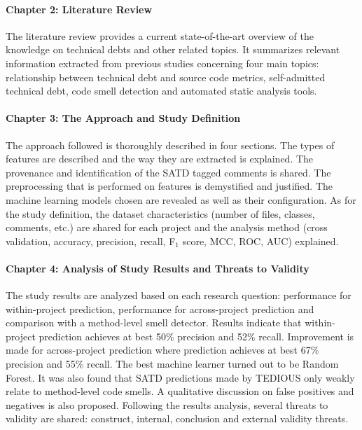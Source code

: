 \paragraph{Chapter 2: Literature Review}
The literature review provides a current state-of-the-art overview of the knowledge on technical debts and other related topics. It summarizes relevant information extracted from previous studies concerning four main topics: relationship between technical debt and source code metrics, self-admitted technical debt, code smell detection and automated static analysis tools.

\paragraph{Chapter 3: The Approach and Study Definition}
The approach followed is thoroughly described in four sections. The types of features are described and the way they are extracted is explained. The provenance and identification of the \ac{SATD} tagged comments is shared. The preprocessing that is performed on features is demystified and justified. The machine learning models chosen are revealed as well as their configuration. As for the study definition, the dataset characteristics (number of files, classes, comments, etc.) are shared for each project and the analysis method (cross validation, accuracy, precision, recall, F$_{1}$ score, \ac{MCC}, \ac{ROC}, \ac{AUC}) explained.

\paragraph{Chapter 4: Analysis of Study Results and Threats to Validity}
The study results are analyzed based on each research question: performance for within-project prediction, performance for across-project prediction and comparison with a method-level smell detector. Results indicate that within-project prediction achieves at best 50\% precision and 52\% recall. Improvement is made for across-project prediction where prediction achieves at best 67\% precision and 55\% recall. The best machine learner turned out to be Random Forest. It was also found that \ac{SATD} predictions made by \ac{TEDIOUS} only weakly relate to method-level code smells. A qualitative discussion on false positives and negatives is also proposed. Following the results analysis, several threats to validity are shared: construct, internal, conclusion and external validity threats.

